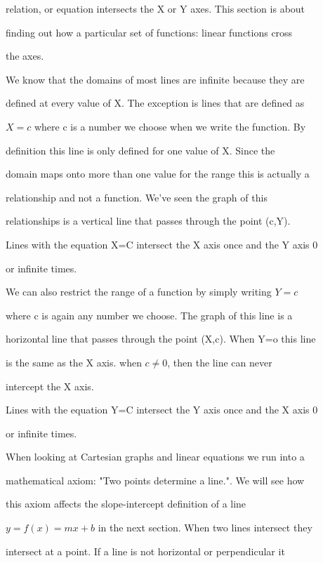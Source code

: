 relation, or equation intersects the X or Y axes. This section is about

finding out how a particular set of functions: linear functions cross

the axes.



We know that the domains of most lines are infinite because they are

defined at every value of X. The exception is lines that are defined as

$X=c$ where c is a number we choose when we write the function. By

definition this line is only defined for one value of X. Since the

domain maps onto more than one value for the range this is actually a

relationship and not a function. We've seen the graph of this

relationships is a vertical line that passes through the point (c,Y).



Lines with the equation X=C intersect the X axis once and the Y axis 0

or infinite times.



We can also restrict the range of a function by simply writing $Y=c$

where c is again any number we choose. The graph of this line is a

horizontal line that passes through the point (X,c). When Y=o this line

is the same as the X axis. when $c \ne 0$, then the line can never

intercept the X axis.



Lines with the equation Y=C intersect the Y axis once and the X axis 0

or infinite times.



When looking at Cartesian graphs and linear equations we run into a

mathematical axiom: "Two points determine a line.". We will see how

this axiom affects the slope-intercept definition of a line

$y= f(x) = m x + b$ in the next section. When two lines intersect they

intersect at a point. If a line is not horizontal or perpendicular it


